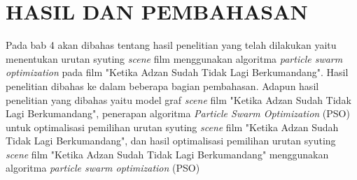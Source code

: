 \renewcommand{\thechapter}{\arabic{chapter}}
\chapter{HASIL DAN PEMBAHASAN}\label{babEmpat}
\renewcommand{\thechapter}{\arabic{chapter}}
\vspace{8mm}

{\frenchspacing
    Pada bab 4 akan dibahas tentang hasil penelitian yang telah dilakukan yaitu menentukan
    urutan syuting \textit{scene} film menggunakan algoritma \textit{particle swarm optimization}
    pada film "Ketika Adzan Sudah Tidak Lagi Berkumandang".
    Hasil penelitian dibahas ke dalam beberapa bagian pembahasan.
    Adapun hasil penelitian yang dibahas yaitu model graf \textit{scene} film "Ketika Adzan Sudah Tidak Lagi Berkumandang",
    penerapan algoritma \textit{Particle Swarm Optimization} (PSO) untuk optimalisasi pemilihan urutan syuting
    \textit{scene} film "Ketika Adzan Sudah Tidak Lagi Berkumandang", dan hasil optimalisasi pemilihan urutan
    syuting \textit{scene} film "Ketika Adzan Sudah Tidak Lagi Berkumandang" menggunakan algoritma \textit{particle swarm optimization} (PSO)
}

